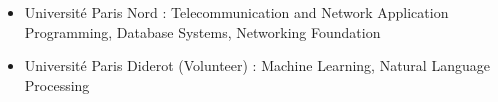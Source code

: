 \documentclass[10pt,a4paper,ragged2e]{altacv}
\begin{document}
	
	\begin{itemize}
		\item Université Paris Nord : Telecommunication and Network Application Programming, Database Systems, Networking Foundation
		\item Université Paris Diderot (Volunteer) : Machine Learning, Natural Language Processing
		
%		
%		
%		
%		
	\end{itemize}

	
	

	
	
	
	
\end{document}
